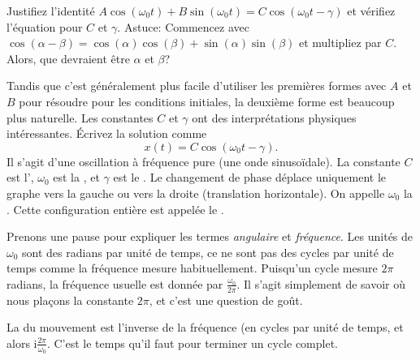 \begin{exercise}
Justifiez l'identité  
	$A \cos (\omega_0 t) + B \sin (\omega_0 t) = C \cos ( \omega_0 t - \gamma )$ 
	et vérifiez l'équation pour $C$ et $\gamma$.  
	Astuce: Commencez avec  
	$\cos (\alpha-\beta) = \cos (\alpha) \cos (\beta) + \sin (\alpha)\sin (\beta)$ 
	et multipliez par $C$.  Alors, que devraient être $\alpha$ et $\beta$?
\end{exercise}

Tandis que c'est généralement plus facile d'utiliser les premières formes avec  $A$ et $B$
pour résoudre pour les conditions initiales, la deuxième forme est beaucoup plus naturelle. 
Les constantes $C$ et $\gamma$ ont des interprétations physiques intéressantes. 
Écrivez la solution comme
\begin{equation*}
	x(t) = C \cos ( \omega_0 t - \gamma ) .
\end{equation*}
Il s'agit d'une oscillation à fréquence pure (une onde sinusoïdale).
La constante  $C$ est l'\emph{}, $\omega_0$ est la 
\emph{},
et $\gamma$ est le \emph{}.
Le changement de phase déplace uniquement le graphe vers la gauche ou vers la droite (translation horizontale). 
On appelle $\omega_0$ la \emph{}.
Cette configuration entière est
appelée le \emph{}.

Prenons une pause pour expliquer les termes \emph{angulaire} et \emph{fréquence}.
Les unités de $\omega_0$ sont des radians par unité de temps, ce ne sont pas des cycles par unité de temps comme la fréquence mesure habituellement. Puisqu'un cycle mesure $2
\pi$ radians, la fréquence usuelle est donnée par  $\frac{\omega_0}{2\pi}$.
Il s'agit simplement de savoir où nous plaçons la constante $2\pi$, 
et c'est une question de goût.

La \emph{} du mouvement est l'inverse de la fréquence  (en cycles par unité de temps, et alors i$\frac{2\pi}{\omega_0}$.  C'est le temps qu'il faut pour terminer un cycle complet.


